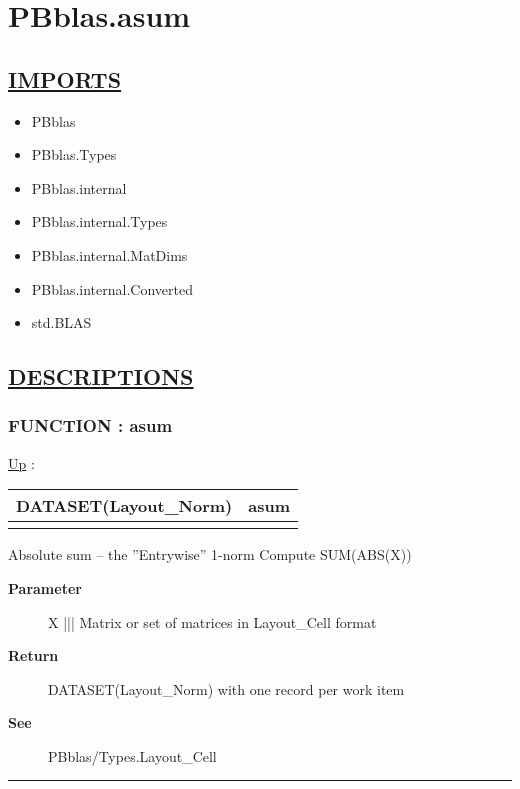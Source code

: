 \chapter*{PBblas.asum}
\hypertarget{ecldoc:toc:PBblas.asum}{}

\section*{\underline{IMPORTS}}
\begin{itemize}
\item PBblas
\item PBblas.Types
\item PBblas.internal
\item PBblas.internal.Types
\item PBblas.internal.MatDims
\item PBblas.internal.Converted
\item std.BLAS
\end{itemize}

\section*{\underline{DESCRIPTIONS}}
\subsection*{FUNCTION : asum}
\hypertarget{ecldoc:pbblas.asum}{}
\hyperlink{ecldoc:toc:PBblas}{Up} :

{\renewcommand{\arraystretch}{1.5}
\begin{tabularx}{\textwidth}{|>{\raggedright\arraybackslash}l|X|}
\hline
\hspace{0pt}DATASET(Layout\_Norm) & asum \\
\hline
\multicolumn{2}{|>{\raggedright\arraybackslash}X|}{\hspace{0pt}(DATASET(Layout\_Cell) X)} \\
\hline
\end{tabularx}
}

\par
Absolute sum -- the ''Entrywise'' 1-norm Compute SUM(ABS(X))

\par
\begin{description}
\item [\textbf{Parameter}] X ||| Matrix or set of matrices in Layout\_Cell format
\item [\textbf{Return}] DATASET(Layout\_Norm) with one record per work item
\item [\textbf{See}] PBblas/Types.Layout\_Cell
\end{description}

\rule{\linewidth}{0.5pt}
